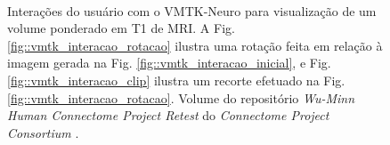  \begin{figure}[htb]
    \centering
    \\
    \caption{Interações do usuário com o VMTK-Neuro para visualização de um volume ponderado em T1 de MRI. A Fig. \ref{fig::vmtk_interacao_rotacao} ilustra uma rotação feita em relação à imagem gerada na Fig. \ref{fig::vmtk_interacao_inicial}, e Fig. \ref{fig::vmtk_interacao_clip} ilustra um recorte efetuado na Fig. \ref{fig::vmtk_interacao_rotacao}. Volume do repositório \textit{Wu-Minn Human Connectome Project Retest} do \textit{Connectome Project Consortium} \cite{essen2012}.
    }
    \label{fig::vmtk_interacao}
\end{figure}
 
